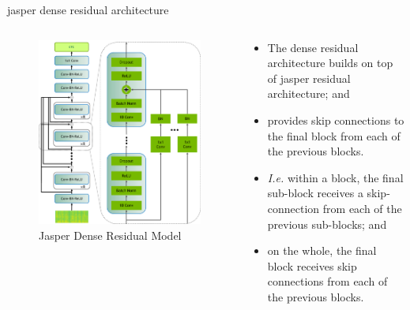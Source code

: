 \documentclass[aspectratio=169,xcolor={dvipsnames,svgnames}]{beamer}
\begin{document}
\begin{frame}[label={sec:jasper-dense-residual-architecture}]{jasper dense residual architecture}
\begin{columns}
\begin{column}{0.45\columnwidth}
\begin{figure}[htbp]
\centering
\includegraphics[width=.9\linewidth]{org-download-images/Contribution/2024-08-28_07-46-36_screenshot.png}
\caption{Jasper Dense Residual Model}
\end{figure}
\end{column}

\begin{column}{0.55\columnwidth}
\begin{itemize}
\item The dense residual architecture builds on top of
jasper residual architecture; and
\item provides skip connections to the final block from
each of the previous blocks.
\item \emph{I.e.} within a block, the final sub-block receives a
skip-connection from each of the previous sub-blocks; and
\item on the whole, the final block receives skip
connections from each of the previous blocks.
\end{itemize}
\end{column}
\end{columns}
\end{frame}
\end{document}
